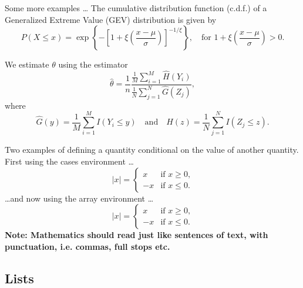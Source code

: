 \documentclass[a4paper,12pt,titlepage]{article} %
\let\leq=\leqslant   %
\let\geq=\geqslant
\numberwithin{equation}{section}  %
\begin{document}
Some more examples \ldots
The cumulative distribution function (c.d.f.) of a Generalized Extreme Value (GEV) distribution is given by
\[ P(X \le x) = \exp\left\{ - \left[ 1+\xi\left(\frac{x-\mu}{\sigma}\right) \right]^{-1/\xi} \right\}, \quad \mbox{for~} 1+\xi\left(\frac{x-\mu}{\sigma}\right) > 0. \]

\newcommand{\disp}{\displaystyle}   %
\let\hat=\widehat                   %
We estimate $\theta$ using the estimator
\[ \widehat{\theta} = \disp\frac1n \frac{\disp\frac1M \disp\sum_{i=1}^M \hat{H}(Y_i)}{\disp\frac1N \disp\sum_{j=1}^N \hat{G}(Z_j)}, \]
where
\[ \hat{G}(y) = \frac1M \sum_{i=1}^M I(Y_i \leq y) \quad \mbox{and} \quad  \hat{H}(z) = \frac1N \sum_{j=1}^N I(Z_j \leq z). \]

Two examples of defining a quantity conditional on the value of another quantity. First using the cases environment \ldots
\begin{equation*}
|x|=
\begin{cases} x & \text{if $x \geq 0$,} \\      %
-x &\text{if $x \leq 0$.}
\end{cases}
\end{equation*}
\ldots and now using the array environment \ldots
\begin{equation*}
|x|= \left\{                                    %
\begin{array}{rc} x & \text{if $x \geq 0$,} \\  %
-x &\text{if $x \leq 0$.}
\end{array} \right.                             %
\end{equation*}
{\bf Note: Mathematics should read just like sentences of text, with punctuation, i.e. commas, full stops etc.}

\subsection{Lists}
\label{sec:lists}
\newcommand{\simiid}{\,\stackrel{{\rm\tiny i.i.d.}}{\sim}\,}  %
\newcommand{\simindep}{\,\stackrel{{\rm\tiny indep}}{\sim}\,} %
\newcommand{\dist}{\,\stackrel{{\rm\tiny d}}{=\!=}\,}         %

\def\approxd{\setbox0=\hbox{$\sim$}                           %
\setbox1=\hbox to \wd0{\hss.\hss}%
\kern 4 pt\raise0.1ex\copy0\kern-\wd0\raise1.2ex%
\copy1\kern-\wd0\copy1\kern 4 pt}
\end{document}
